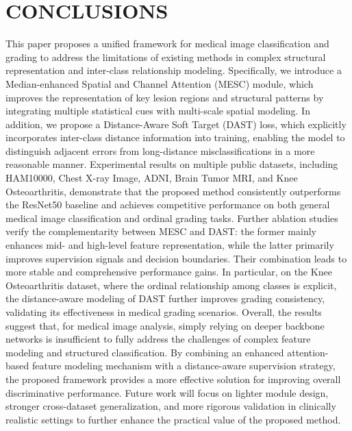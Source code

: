 \documentclass[letterpaper, 10 pt, conference]{ieeeconf}  %
\begin{document}
   

\section{CONCLUSIONS}

This paper proposes a unified framework for medical image classification and grading to address the limitations of existing methods in complex structural representation and inter-class relationship modeling. Specifically, we introduce a Median-enhanced Spatial and Channel Attention (MESC) module, which improves the representation of key lesion regions and structural patterns by integrating multiple statistical cues with multi-scale spatial modeling. In addition, we propose a Distance-Aware Soft Target (DAST) loss, which explicitly incorporates inter-class distance information into training, enabling the model to distinguish adjacent errors from long-distance misclassifications in a more reasonable manner.
Experimental results on multiple public datasets, including HAM10000, Chest X-ray Image, ADNI, Brain Tumor MRI, and Knee Osteoarthritis, demonstrate that the proposed method consistently outperforms the ResNet50 baseline and achieves competitive performance on both general medical image classification and ordinal grading tasks. Further ablation studies verify the complementarity between MESC and DAST: the former mainly enhances mid- and high-level feature representation, while the latter primarily improves supervision signals and decision boundaries. Their combination leads to more stable and comprehensive performance gains. In particular, on the Knee Osteoarthritis dataset, where the ordinal relationship among classes is explicit, the distance-aware modeling of DAST further improves grading consistency, validating its effectiveness in medical grading scenarios.
Overall, the results suggest that, for medical image analysis, simply relying on deeper backbone networks is insufficient to fully address the challenges of complex feature modeling and structured classification. By combining an enhanced attention-based feature modeling mechanism with a distance-aware supervision strategy, the proposed framework provides a more effective solution for improving overall discriminative performance. Future work will focus on lighter module design, stronger cross-dataset generalization, and more rigorous validation in clinically realistic settings to further enhance the practical value of the proposed method.

\addtolength{\textheight}{-2cm}   %
\end{document}
